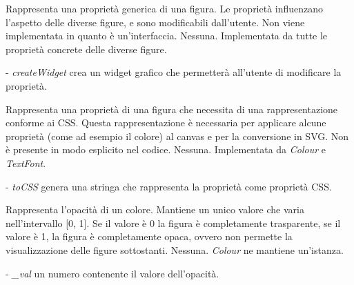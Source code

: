 Rappresenta una propriet\`a generica di una figura. Le propriet\`a influenzano 
l'aspetto delle diverse figure, e sono modificabili dall'utente. Non viene implementata in quanto \`e un'interfaccia.
Nessuna.
Implementata da tutte le propriet\`a concrete delle diverse figure.
\begin{elencopuntato}[\subsubsecindent]
\item[-] \textit{createWidget} crea un widget grafico che permetter\`a all'utente di modificare la propriet\`a.
\end{elencopuntato}

Rappresenta una propriet\`a di una figura che necessita di una rappresentazione conforme ai CSS. Questa rappresentazione \`e necessaria per applicare alcune propriet\`a (come ad esempio il colore) al canvas e per la conversione in SVG. Non \`e presente in modo esplicito nel codice.
Nessuna.
Implementata da \textit{Colour} e \textit{TextFont}. 
\begin{elencopuntato}[\subsubsecindent]
\item[-] \textit{toCSS} genera una stringa che rappresenta la propriet\`a come propriet\`a CSS.
\end{elencopuntato}

Rappresenta l'opacit\`a di un colore. Mantiene un unico valore che varia nell'intervallo [0, 1]. Se il valore \`e 0 la figura \`e completamente trasparente, se
il valore \`e 1, la figura \`e completamente opaca, ovvero non permette la visualizzazione delle figure sottostanti.
Nessuna.
\textit{Colour} ne mantiene un'istanza.
\begin{elencopuntato}[\subsubsecindent]
\item[-] \textit{\_val} un numero contenente il valore dell'opacit\`a.
\end{elencopuntato}
